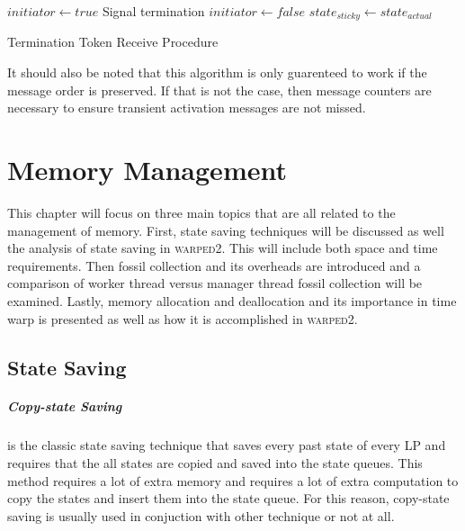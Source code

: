 \documentclass[11pt]{book}
\begin{document}
\begin{algorithm}
\DontPrintSemicolon
\SetAlgoVlined
{}
    $initiator \gets true$\;
     {
         {
            Signal termination\;
        }
    }  {
        $initiator \gets false$\;
        \;
    }
    $state_{sticky} \gets state_{actual}$\;
\caption{Termination Token Receive Procedure}\label{termination_token_receive}
\end{algorithm}

It should also be noted that this algorithm is only guarenteed to work if the message order
is preserved. If that is not the case, then message counters are necessary to ensure
transient activation messages are not missed.

\chapter{Memory Management}\label{memory_management}

This chapter will focus on three main topics that are all related to the management
of memory. First, state saving techniques will be discussed as well the analysis of state
saving in \textsc{warped2}. This will include both space and time requirements. Then fossil
collection and its overheads are introduced and a comparison of worker thread versus manager
thread fossil collection will be examined. Lastly, memory allocation and deallocation and
its importance in time warp is presented as well as how it is accomplished in \textsc{warped2}.

\section{State Saving}

\paragraph{Copy-state Saving} is the classic state saving technique that saves every past
state of every LP and requires that the all states are copied and saved into the state queues.
This method requires a lot of extra memory and requires a lot of extra computation to copy
the states and insert them into the state queue. For this reason, copy-state saving is
usually used in conjuction with other technique or not at all.
\end{document}
